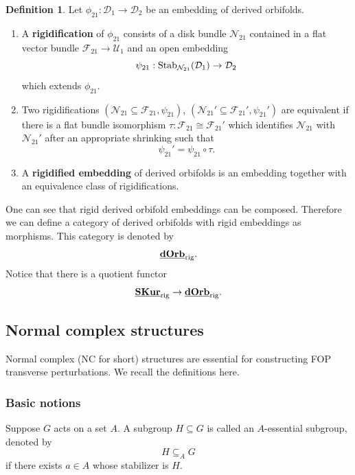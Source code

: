 \documentclass[reqno, 10pt]{amsart}
\numberwithin{equation}{section}
\numberwithin{equation}{section}
\renewcommand{\subset}{\subseteq}
\theoremstyle{definition}
\newtheorem{defn}[thm]{Definition}
\theoremstyle{remark}
\newcommand{\beqn}{\begin{equation*}}
\newcommand{\eeqn}{\end{equation*}}
\newcommand{\mc}{\mathcal}
\newcommand{\uds}[1]{\underline{\smash{#1}}}
\begin{document}
\begin{defn}\label{defn_rigid_embedding_D}
Let $\phi_{21}: {\mc D}_1 \to {\mc D}_2   $ be an embedding of derived orbifolds. 
\begin{enumerate}

\item A {\bf rigidification} of $\phi_{21}$ consists of a disk bundle ${\mc N}_{21}$ contained in a flat vector bundle ${\mc F}_{21} \to {\mc U}_1$ and an open embedding
\beqn
\psi_{21}: {\rm Stab}_{{\mc N}_{21}}({\mc D}_1) \to {\mc D}_2
\eeqn
which extends $\phi_{21}$. 

\item Two rigidifications $({\mc N}_{21} \subset {\mc F}_{21}, \psi_{21})$, $({\mc N}_{21}'\subset {\mc F}_{21}', \psi_{21}')$ are equivalent if there is a flat bundle isomorphism $\tau: {\mc F}_{21} \cong {\mc F}_{21}'$ which identifies ${\mc N}_{21}$ with ${\mc N}_{21}'$ after an appropriate shrinking such that 
\beqn
\psi_{21}' = \psi_{21} \circ \tau.
\eeqn

\item A {\bf rigidified embedding} of derived orbifolds is an embedding together with an equivalence class of rigidifications. 
\end{enumerate}
\end{defn}

One can see that rigid derived orbifold embeddings can be composed. Therefore we can define a category of derived orbifolds with rigid embeddings as morphisms. This category is denoted by 
\beqn
\uds{\bf dOrb}_{\rm rig}.
\eeqn
Notice that there is a quotient functor
\beqn
\uds{\bf SKur}_{\rm rig} \to \uds{\bf dOrb}_{\rm rig}.
\eeqn



\subsection{Normal complex structures}

Normal complex (NC for short) structures are essential for constructing FOP transverse perturbations. We recall the definitions here. 

\subsubsection{Basic notions}

Suppose $G$ acts on a set $A$. A subgroup $H \subset G$ is called an $A$-essential subgroup, denoted by 
\beqn
H \subset_A G
\eeqn
if there exists $a \in A$ whose stabilizer is $H$. 
\end{document}
